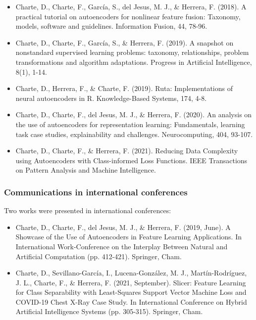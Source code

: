 \begin{itemize}
    \item Charte, D., Charte, F., García, S., del Jesus, M. J., \& Herrera, F. (2018). A practical tutorial on autoencoders for nonlinear feature fusion: Taxonomy, models, software and guidelines. Information Fusion, 44, 78-96.
    \item Charte, D., Charte, F., García, S., \& Herrera, F. (2019). A snapshot on nonstandard supervised learning problems: taxonomy, relationships, problem transformations and algorithm adaptations. Progress in Artificial Intelligence, 8(1), 1-14.
    \item Charte, D., Herrera, F., \& Charte, F. (2019). Ruta: Implementations of neural autoencoders in R. Knowledge-Based Systems, 174, 4-8.
    \item Charte, D., Charte, F., del Jesus, M. J., \& Herrera, F. (2020). An analysis on the use of autoencoders for representation learning: Fundamentals, learning task case studies, explainability and challenges. Neurocomputing, 404, 93-107.
    \item Charte, D., Charte, F., \& Herrera, F. (2021). Reducing Data Complexity using Autoencoders with Class-informed Loss Functions. IEEE Transactions on Pattern Analysis and Machine Intelligence.
\end{itemize}

\subsubsection{Communications in international conferences}

Two works were presented in international conferences:

\begin{itemize}
    \item Charte, D., Charte, F., del Jesus, M. J., \& Herrera, F. (2019, June). A Showcase of the Use of Autoencoders in Feature Learning Applications. In International Work-Conference on the Interplay Between Natural and Artificial Computation (pp. 412-421). Springer, Cham.
    \item Charte, D., Sevillano-García, I., Lucena-González, M. J., Martín-Rodríguez, J. L., Charte, F., \& Herrera, F. (2021, September). Slicer: Feature Learning for Class Separability with Least-Squares Support Vector Machine Loss and COVID-19 Chest X-Ray Case Study. In International Conference on Hybrid Artificial Intelligence Systems (pp. 305-315). Springer, Cham.
\end{itemize}


